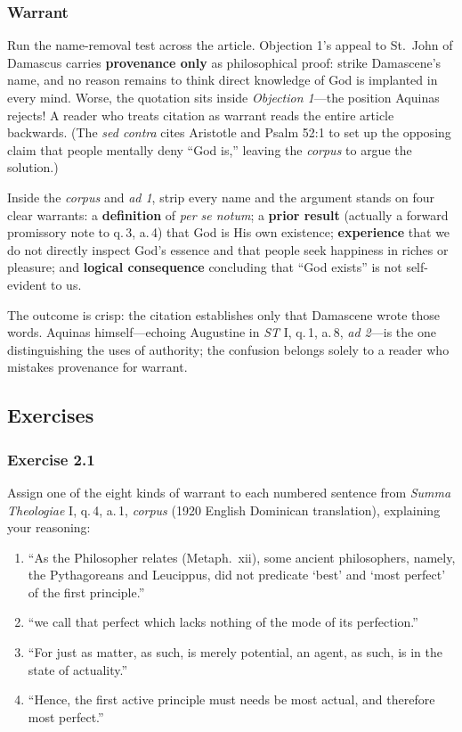 \subsubsection*{Warrant}
Run the name-removal test across the article. Objection 1's appeal to St.\ John of Damascus carries \textbf{provenance only} as philosophical proof: strike Damascene's name, and no reason remains to think direct knowledge of God is implanted in every mind. Worse, the quotation sits inside \emph{Objection 1}---the position Aquinas rejects! A reader who treats citation as warrant reads the entire article backwards. (The \emph{sed contra} cites Aristotle and Psalm 52:1 to set up the opposing claim that people mentally deny ``God is,'' leaving the \emph{corpus} to argue the solution.)

Inside the \emph{corpus} and \emph{ad 1}, strip every name and the argument stands on four clear warrants: a \textbf{definition} of \emph{per se notum}; a \textbf{prior result} (actually a forward promissory note to q.\,3, a.\,4) that God is His own existence; \textbf{experience} that we do not directly inspect God's essence and that people seek happiness in riches or pleasure; and \textbf{logical consequence} concluding that ``God exists'' is not self-evident to us.

The outcome is crisp: the citation establishes only that Damascene wrote those words. Aquinas himself---echoing Augustine in \emph{ST} I, q.\,1, a.\,8, \emph{ad 2}---is the one distinguishing the uses of authority; the confusion belongs solely to a reader who mistakes provenance for warrant.

\subsection{Exercises}

\subsubsection*{Exercise 2.1}
Assign one of the eight kinds of warrant to each numbered sentence from \emph{Summa Theologiae} I, q.\,4, a.\,1, \emph{corpus} (1920 English Dominican translation), explaining your reasoning:

\begin{enumerate}
\item ``As the Philosopher relates (Metaph.\ xii), some ancient philosophers, namely, the Pythagoreans and Leucippus, did not predicate `best' and `most perfect' of the first principle.''
\item ``we call that perfect which lacks nothing of the mode of its perfection.''
\item ``For just as matter, as such, is merely potential, an agent, as such, is in the state of actuality.''
\item ``Hence, the first active principle must needs be most actual, and therefore most perfect.''
\end{enumerate}

